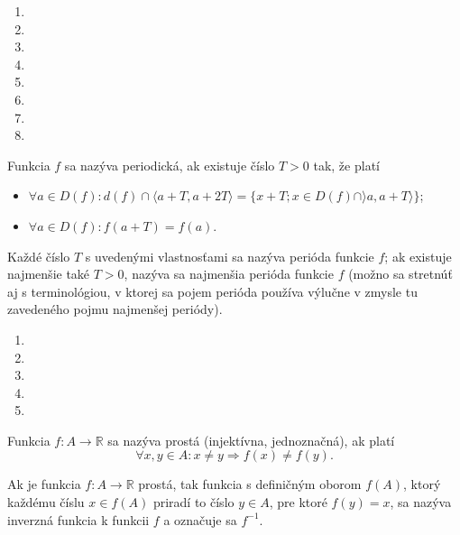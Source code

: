 \begin{enumerate}[resume]
  \item {}
  \item {}
  \item {}
  \showanswers
  \item {}
  \hideanswers
  \item {}
  \item {}
  \item {}
  \item {}
\end{enumerate}

Funkcia $f$ sa nazýva periodická, ak existuje číslo $T>0$ tak, že platí
\begin{itemize}
\item $\forall a\in D(f):d(f)\cap \langle a+T,a+2T\rangle=\{x+T;x\in D(f)\cap \rangle a,a+T\rangle\}$;
\item  $\forall a\in D(f):f(a+T)=f(a)$.
\end{itemize}

Každé číslo $T$ s uvedenými vlastnosťami sa nazýva perióda funkcie $f$; ak
existuje najmenšie také $T>0$, nazýva sa najmenšia perióda funkcie $f$ (možno sa
stretnúť aj s terminológiou, v ktorej sa pojem perióda používa výlučne v zmysle
tu zavedeného pojmu najmenšej periódy).

\begin{enumerate}[resume]
  \item {}
  \item {}
  \item {}
  \item {}
  \item {}
\end{enumerate}

Funkcia $f:A \rightarrow\mathbb{R}$ sa nazýva prostá (injektívna, jednoznačná),
ak platí $$\forall x,y\in A:x\neq y \Rightarrow f(x)\neq f(y).$$

Ak je funkcia $f:A \rightarrow \mathbb{R}$ prostá, tak funkcia s definičným
oborom $f(A)$, ktorý každému číslu $x\in f(A)$ priradí to číslo $y\in A$, pre
ktoré $f(y)=x$, sa nazýva inverzná funkcia k funkcii $f$ a označuje sa $f^{-1}$.

